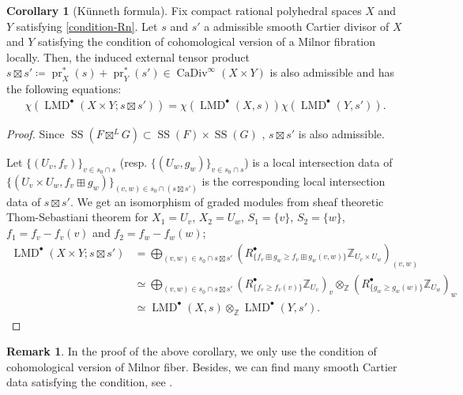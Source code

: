 \documentclass[a4paper,dvipdfmx,reqno,12pt]{amsart}
\theoremstyle{definition}
\newtheorem{corollary}[theorem]{Corollary}
\newtheorem{remark}[theorem]{Remark}
\newcommand{\deq}{\coloneqq}
\newcommand{\Z}{\mathbb{Z}}%
\newcommand{\opn}[1]{\operatorname{#1}}
\numberwithin{equation}{section}
\begin{document}
\begin{corollary}[{K\"unneth formula}]
Fix compact rational polyhedral spaces $X$ and $Y$
satisfying \cref{condition-Rn}.
Let $s$ and $s'$ a admissible smooth Cartier divisor of $X$ and $Y$ 
satisfying the condition of cohomological version of a Milnor 
fibration \cite[Assumption 1.1.1]{MR2031639} locally.
Then, the induced external tensor product 
$s\boxtimes s'\deq \opn{pr}_X^{*} (s)+\opn{pr}_Y^{*}(s')
\in \opn{CaDiv}^{\infty}(X\times Y)$ is also admissible and
has the following equations:
\begin{align}
\chi(\opn{LMD}^{\bullet}(X\times Y;s\boxtimes s'))=
\chi(\opn{LMD}^{\bullet}(X,s))\chi(\opn{LMD}^{\bullet}(Y,s')).
\end{align}

\end{corollary}
\begin{proof}
Since 
$\opn{SS}(F\boxtimes^{L} G)\subset 
\opn{SS}(F)\times \opn{SS}(G)$
\cite[Proposition 5.4.1]{MR1299726},
$s\boxtimes s'$ is also admissible.

Let $\{(U_v,f_v)\}_{v\in s_0\cap s}$
(resp. $\{(U_w,g_w)\}_{v\in s_0\cap s}$) is a
local intersection data of
$\{(U_{v}\times U_w,f_v\boxplus g_w)\}_{
(v,w)\in s_0 \cap 
(s\boxtimes s')}$ is the 
corresponding local intersection data 
of $s\boxtimes s'$.  
We get an isomorphism of graded modules
from sheaf theoretic Thom-Sebastiani theorem for 
$X_1=U_{v}$, $X_2=U_w$, $S_1=\{v\}$, $S_2=\{w\}$,
$f_1= f_v-f_v(v)$ and 
$f_2= f_w-f_w(w)$;
\begin{align}
\opn{LMD}^{\bullet}(X\times Y;s\boxtimes s') 
& =\bigoplus_{(v,w)\in s_0\cap s\boxtimes s'}
(R^{\bullet}_{\{f_v\boxplus g_w\geq f_v\boxplus g_w(v,w)\}}
\Z_{U_{v}\times U_w})_{(v,w)} \\
& \simeq \bigoplus_{(v,w)\in s_0\cap s\boxtimes s'}
(R^{\bullet}_{\{f_v\geq f_v(v)\}}\Z_{U_v})_v
\otimes_{\Z} (R^{\bullet}_{\{g_w\geq g_w(w)\}}\Z_{U_w})_w \\
& \simeq
\opn{LMD}^{\bullet}(X,s)\otimes_{\Z} 
\opn{LMD}^{\bullet}(Y,s').
\end{align}

\end{proof}

\begin{remark}
In the proof of the above corollary, we only use
the condition of cohomological version of Milnor fiber. 
Besides, we can find many smooth Cartier data satisfying 
the condition, see \cite[p.35]{MR2031639}.  
\end{remark}
\end{document}
